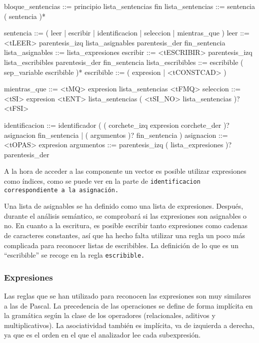 \begin{codigo}
bloque_sentencias ::= principio lista_sentencias fin
lista_sentencias ::= sentencia ( sentencia )*

sentencia ::= ( leer | escribir | identificacion | seleccion | mientras_que )
leer ::= <tLEER> parentesis_izq lista_asignables parentesis_der fin_sentencia
lista_asignables ::= lista_expresiones
escribir ::= <tESCRIBIR> parentesis_izq lista_escribibles parentesis_der fin_sentencia
lista_escribibles ::= escribible ( sep_variable escribible )*
escribible ::= ( expresion | <tCONSTCAD> )

mientras_que ::= <tMQ> expresion lista_sentencias <tFMQ>
seleccion ::= <tSI> expresion <tENT> lista_sentencias ( <tSI_NO> lista_sentencias )? <tFSI>

identificacion ::= identificador ( ( corchete_izq expresion corchete_der )? asignacion fin_sentencia | ( argumentos )? fin_sentencia )
asignacion ::= <tOPAS> expresion
argumentos ::= parentesis_izq ( lista_expresiones )? parentesis_der
\end{codigo}

A la hora de acceder a las componente un vector es posible utilizar expresiones como índices, como se puede ver en la parte de \tt{identificacion} correspondiente a la asignación.

Una lista de asignables se ha definido como una lista de expresiones. Después, durante el análisis semántico, se comprobará si las expresiones son asignables o no. En cuanto a la escritura, es posible escribir tanto expresiones como cadenas de caracteres constantes, así que ha hecho falta utilizar una regla un poco más complicada para reconocer listas de escribibles. La definición de lo que es un ``escribible'' se recoge en la regla \tt{escribible}.

\subsubsection{Expresiones}
Las reglas que se han utilizado para reconocen las expresiones son muy similares a las de Pascal. La precedencia de las operaciones se define de forma implícita en la gramática según la clase de los operadores (relacionales, aditivos y multiplicativos). La asociatividad también es implícita, va de izquierda a derecha, ya que es el orden en el que el analizador lee cada subexpresión.

